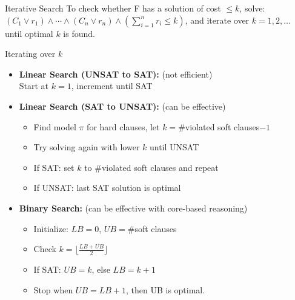 \documentclass[t,english]{sdqbeamer}
\begin{document}
\begin{frame}{Iterative Search}
\vspace{-2em}
To check whether F has a solution of cost $\leq k$, solve: $(C_1 \vee r_1) \wedge \cdots \wedge (C_n \vee r_n) \wedge \left(\sum_{i=1}^n r_i \leq k\right)$, and iterate over $k = 1, 2, \dots$ until optimal $k$ is found.\\[1ex]
\begin{block}{Iterating over $k$}
	\begin{itemize}\itemsep1ex
		\item \textbf{Linear Search (UNSAT to SAT):} (not efficient)\\
		Start at $k = 1$, increment until SAT
		\item \textbf{Linear Search (SAT to UNSAT):} (can be effective)\\
		\begin{itemize}
			\item Find model $\pi$ for hard clauses, let $k = \#$violated soft clauses$-1$
			\item Try solving again with lower $k$ until UNSAT
			\item If SAT: set $k$ to $\#$violated soft clauses and repeat
			\item If UNSAT: last SAT solution is optimal
		\end{itemize}
		\item \textbf{Binary Search:} (can be effective with core-based reasoning)\\
		\begin{itemize}
			\item Initialize: $LB = 0$, $UB = \#$soft clauses
			\item Check $k = \lfloor \frac{LB + UB}{2} \rfloor$
			\item If SAT: $UB = k$, else $LB = k + 1$
			\item Stop when $UB = LB + 1$, then UB is optimal.
		\end{itemize}
	\end{itemize}
\end{block}
\end{frame}
\end{document}
